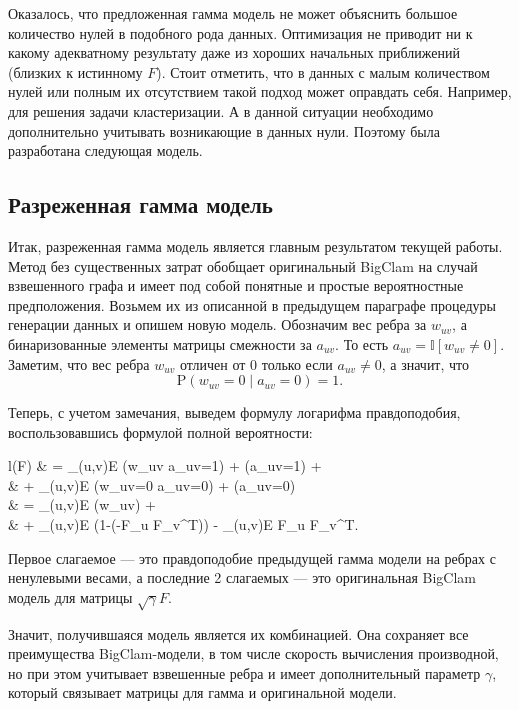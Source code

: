 \documentclass{ITaSconf}
\def\PP{\mathrm{P}}
\begin{document}
	Оказалось, что предложенная гамма модель не может объяснить большое количество нулей в подобного рода данных. 
	Оптимизация не приводит ни к какому адекватному результату даже из хороших начальных приближений (близких к истинному $F$).
	Стоит отметить, что в данных с малым количеством нулей или полным их отсутствием такой подход может оправдать себя. 
	Например, для решения задачи кластеризации.
	А в данной ситуации необходимо дополнительно учитывать возникающие в данных нули. Поэтому была разработана следующая модель.
	
	
	\subsection{Разреженная гамма модель}
	
	Итак, разреженная гамма модель является главным результатом текущей работы. 
	Метод без существенных затрат обобщает оригинальный BigClam на случай взвешенного графа и имеет под собой понятные и простые вероятностные предположения. Возьмем их из описанной в предыдущем параграфе процедуры генерации данных и опишем новую модель. 
	Обозначим вес ребра за $w_{uv}$, а бинаризованные элементы матрицы смежности за $a_{uv}$. То есть $a_{uv} = \mathbb I \left[w_{uv} \ne 0\right]$. Заметим, что вес ребра $w_{uv}$ отличен от 0 только если $a_{uv}\ne0$, а значит, что 
	$$ \PP(w_{uv}=0 \mid a_{uv}=0) = 1.$$
	
	Теперь, с учетом замечания, выведем формулу логарифма правдоподобия, воспользовавшись формулой полной вероятности:
	\begin{flalign*}
	l(F) & = \sum_{(u,v)\in E} \log \PP(w_{uv} \mid a_{uv}=1) + \log \PP(a_{uv}=1) + \\
	& \quad + \sum_{(u,v)\notin E} \log \PP(w_{uv}=0 \mid a_{uv}=0) + \log \PP(a_{uv}=0) \\
	& = \sum_{(u,v)\in E} \log {}(w_{uv}) + \\
	& \quad + \sum_{(u,v)\in E} \log\left(1-\exp\left(-\gamma F_u {F_v}^T\right)\right) - \gamma \sum_{(u,v)\notin E} F_u {F_v}^T.
	\end{flalign*}
	
	Первое слагаемое --- это правдоподобие предыдущей гамма модели на ребрах с ненулевыми весами, а последние 2 слагаемых --- это оригинальная BigClam модель для матрицы $\sqrt \gamma F$.
	
	Значит, получившаяся модель является их комбинацией. 
	Она сохраняет все преимущества BigClam-модели, в том числе скорость вычисления производной, но при этом учитывает взвешенные ребра и имеет дополнительный параметр $\gamma$, который связывает матрицы для гамма и оригинальной модели.
	
\end{document}
